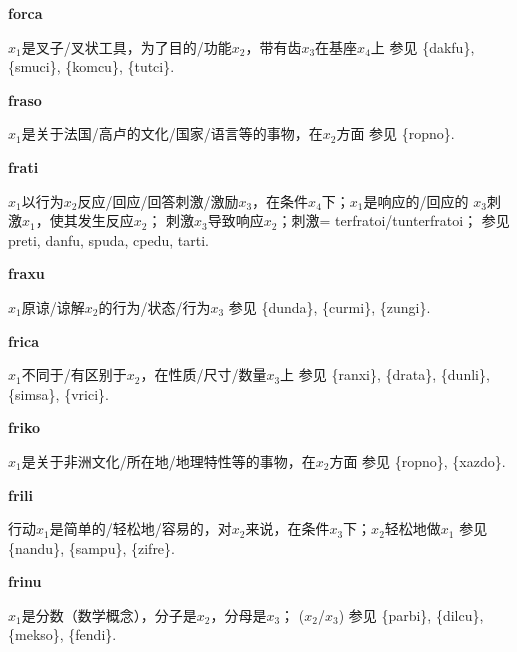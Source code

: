 \documentclass[notitlepage,twocolumn,a4paper,10pt]{book}
\begin{document}
{\sffamily\bfseries forca}\enspace {\ttfamily\bfseries[    fro]}  $x_1$是叉子\slash{}叉状工具，为了目的\slash{}功能$x_2$，带有齿$x_3$在基座$x_4$上 \textemdash{} 参见 \{dakfu\}, \{smuci\}, \{komcu\}, \{tutci\}.

{\sffamily\bfseries fraso}\enspace {\ttfamily\bfseries[fas]}  $x_1$是关于法国\slash{}高卢的文化\slash{}国家\slash{}语言等的事物，在$x_2$方面 \textemdash{} 参见 \{ropno\}.

{\sffamily\bfseries frati}\enspace {\ttfamily\bfseries[    fra]}  $x_1$以行为$x_2$反应\slash{}回应\slash{}回答刺激\slash{}激励$x_3$，在条件$x_4$下；$x_1$是响应的\slash{}回应的 \textemdash{} $x_3$刺激$x_1$，使其发生反应$x_2$； 刺激$x_3$导致响应$x_2$；刺激= {terfratoi}\slash{}{tunterfratoi}； 参见 {preti}, {danfu}, {spuda}, {cpedu}, {tarti}.

{\sffamily\bfseries fraxu}\enspace {\ttfamily\bfseries[fax]}  $x_1$原谅\slash{}谅解$x_2$的行为\slash{}状态\slash{}行为$x_3$ \textemdash{} 参见 \{dunda\}, \{curmi\}, \{zungi\}.

{\sffamily\bfseries frica}\enspace {\ttfamily\bfseries[fic]}  $x_1$不同于\slash{}有区别于$x_2$，在性质\slash{}尺寸\slash{}数量$x_3$上 \textemdash{} 参见 \{ranxi\}, \{drata\}, \{dunli\}, \{simsa\}, \{vrici\}.

{\sffamily\bfseries friko}\enspace {\ttfamily\bfseries[        fi'o]}  $x_1$是关于非洲文化\slash{}所在地\slash{}地理特性等的事物，在$x_2$方面 \textemdash{} 参见 \{ropno\}, \{xazdo\}.

{\sffamily\bfseries frili}\enspace {\ttfamily\bfseries[fil]}  行动$x_1$是简单的\slash{}轻松地\slash{}容易的，对$x_2$来说，在条件$x_3$下；$x_2$轻松地做$x_1$ \textemdash{} 参见 \{nandu\}, \{sampu\}, \{zifre\}.

{\sffamily\bfseries frinu} $x_1$是分数（数学概念），分子是$x_2$，分母是$x_3$； ($x_2$\slash{}$x_3$) \textemdash{} 参见 \{parbi\}, \{dilcu\}, \{mekso\}, \{fendi\}.
\end{document}
